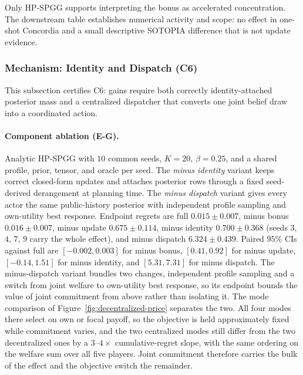 Only HP-SPGG supports interpreting the bonus as accelerated concentration. The downstream table establishes numerical activity and scope: no effect in one-shot Concordia and a small descriptive SOTOPIA difference that is not update evidence.

\subsubsection{Mechanism: Identity and Dispatch (C6)}
\label{app:mechanism}
\label{app:ablations}
\label{app:decent-extended}

This subsection certifies C6: gains require both correctly identity-attached posterior mass and a centralized dispatcher that converts one joint belief draw into a coordinated action.

\paragraph{Component ablation (E-G).} Analytic HP-SPGG with $10$ common seeds, $K{=}20$, $\beta{=}0.25$, and a shared profile, prior, tensor, and oracle per seed. The \emph{minus identity} variant keeps correct closed-form updates and attaches posterior rows through a fixed seed-derived derangement at planning time. The \emph{minus dispatch} variant gives every actor the same public-history posterior with independent profile sampling and own-utility best response. Endpoint regrets are full $0.015\pm0.007$, minus bonus $0.016\pm0.007$, minus update $0.675\pm0.114$, minus identity $0.700\pm0.368$ (seeds $3$, $4$, $7$, $9$ carry the whole effect), and minus dispatch $6.324\pm0.439$. Paired $95\%$ CIs against full are $[-0.002,0.003]$ for minus bonus, $[0.41,0.92]$ for minus update, $[-0.14,1.51]$ for minus identity, and $[5.31,7.31]$ for minus dispatch. The minus-dispatch variant bundles two changes, independent profile sampling and a switch from joint welfare to own-utility best response, so its endpoint bounds the value of joint commitment from above rather than isolating it. The mode comparison of Figure~\ref{fig:decentralized-price} separates the two. All four modes there select on own or focal payoff, so the objective is held approximately fixed while commitment varies, and the two centralized modes still differ from the two decentralized ones by a $3$--$4\times$ cumulative-regret slope, with the same ordering on the welfare sum over all five players. Joint commitment therefore carries the bulk of the effect and the objective switch the remainder.

